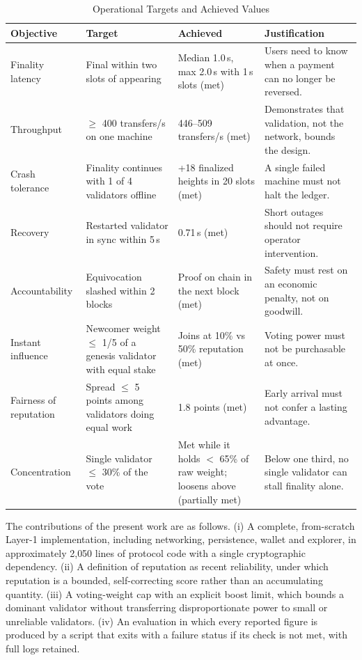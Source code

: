 \documentclass[conference]{IEEEtran}
\begin{document}
\begin{table}[t]
\centering
\caption{Operational Targets and Achieved Values}
\label{tab:targets}
\small
\begin{tabularx}{\textwidth}{@{}L{3.1cm} L{3.4cm} L{3.9cm} Y@{}}
\toprule
\textbf{Objective} & \textbf{Target} & \textbf{Achieved} & \textbf{Justification}\\
\midrule
Finality latency & Final within two slots of appearing & Median 1.0\,s, max 2.0\,s with 1\,s slots (met) & Users need to know when a payment can no longer be reversed.\\
Throughput & $\geq$ 400 transfers/s on one machine & 446--509 transfers/s (met) & Demonstrates that validation, not the network, bounds the design.\\
Crash tolerance & Finality continues with 1 of 4 validators offline & +18 finalized heights in 20 slots (met) & A single failed machine must not halt the ledger.\\
Recovery & Restarted validator in sync within 5\,s & 0.71\,s (met) & Short outages should not require operator intervention.\\
Accountability & Equivocation slashed within 2 blocks & Proof on chain in the next block (met) & Safety must rest on an economic penalty, not on goodwill.\\
Instant influence & Newcomer weight $\leq$ 1/5 of a genesis validator with equal stake & Joins at 10\% vs 50\% reputation (met) & Voting power must not be purchasable at once.\\
Fairness of reputation & Spread $\leq$ 5 points among validators doing equal work & 1.8 points (met) & Early arrival must not confer a lasting advantage.\\
Concentration & Single validator $\leq$ 30\% of the vote & Met while it holds $<$ 65\% of raw weight; loosens above (partially met) & Below one third, no single validator can stall finality alone.\\
\bottomrule
\end{tabularx}
\end{table}

The contributions of the present work are as follows. (i) A complete, from-scratch Layer-1 implementation, including networking, persistence, wallet and explorer, in approximately 2{,}050 lines of protocol code with a single cryptographic dependency. (ii) A definition of reputation as recent reliability, under which reputation is a bounded, self-correcting score rather than an accumulating quantity. (iii) A voting-weight cap with an explicit boost limit, which bounds a dominant validator without transferring disproportionate power to small or unreliable validators. (iv) An evaluation in which every reported figure is produced by a script that exits with a failure status if its check is not met, with full logs retained.
\end{document}
